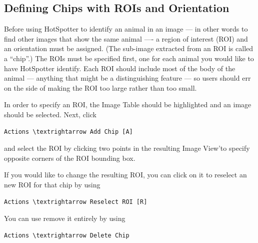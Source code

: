 \documentclass[a4paper,10pt]{article}
\begin{document}
    \subsection{Defining Chips with ROIs and Orientation}
        Before using HotSpotter to identify an animal in an image ---
        in other words to find other images that show the same
        animal ---- a region of interest (ROI) and an orientation must
        be assigned.  (The sub-image extracted from an ROI is called a
        ``chip''.)  The ROIs must be specified first, one for each
        animal you would like to have HotSpotter identify.
%
        Each ROI should include most of the body of the animal ---
        anything that might be a distinguishing feature --- so users should err on the
        side of making the ROI too large rather than too small.

        In order to specify an ROI, the Image Table should be
        highlighted and an image should be selected.  Next, click
        \begin{Verbatim}[commandchars=\\\{\}]
        Actions \textrightarrow Add Chip [A]
        \end{Verbatim}
        and select the ROI by clicking two points in the resulting Image
        View'to specify opposite corners of the ROI bounding box.

        \;

        If you would like to change the resulting ROI, you can click on it to reselect an new ROI for that chip by
        using
        \begin{Verbatim}[commandchars=\\\{\}]
        Actions \textrightarrow Reselect ROI [R]
        \end{Verbatim}
        You can use remove it entirely by using 
        \begin{Verbatim}[commandchars=\\\{\}]
        Actions \textrightarrow Delete Chip
        \end{Verbatim}
\end{document}
